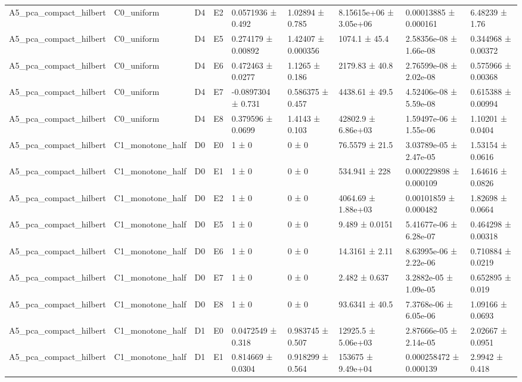 \begin{table}
\begin{tabular}{lllllllll}
A5\_pca\_compact\_hilbert & C0\_uniform & D4 & E2 & 0.0571936 ± 0.492 & 1.02894 ± 0.785 & 8.15615e+06 ± 3.05e+06 & 0.00013885 ± 0.000161 & 6.48239 ± 1.76 \\
A5\_pca\_compact\_hilbert & C0\_uniform & D4 & E5 & 0.274179 ± 0.00892 & 1.42407 ± 0.000356 & 1074.1 ± 45.4 & 2.58356e-08 ± 1.66e-08 & 0.344968 ± 0.00372 \\
A5\_pca\_compact\_hilbert & C0\_uniform & D4 & E6 & 0.472463 ± 0.0277 & 1.1265 ± 0.186 & 2179.83 ± 40.8 & 2.76599e-08 ± 2.02e-08 & 0.575966 ± 0.00368 \\
A5\_pca\_compact\_hilbert & C0\_uniform & D4 & E7 & -0.0897304 ± 0.731 & 0.586375 ± 0.457 & 4438.61 ± 49.5 & 4.52406e-08 ± 5.59e-08 & 0.615388 ± 0.00994 \\
A5\_pca\_compact\_hilbert & C0\_uniform & D4 & E8 & 0.379596 ± 0.0699 & 1.4143 ± 0.103 & 42802.9 ± 6.86e+03 & 1.59497e-06 ± 1.55e-06 & 1.10201 ± 0.0404 \\
A5\_pca\_compact\_hilbert & C1\_monotone\_half & D0 & E0 & 1 ± 0 & 0 ± 0 & 76.5579 ± 21.5 & 3.03789e-05 ± 2.47e-05 & 1.53154 ± 0.0616 \\
A5\_pca\_compact\_hilbert & C1\_monotone\_half & D0 & E1 & 1 ± 0 & 0 ± 0 & 534.941 ± 228 & 0.000229898 ± 0.000109 & 1.64616 ± 0.0826 \\
A5\_pca\_compact\_hilbert & C1\_monotone\_half & D0 & E2 & 1 ± 0 & 0 ± 0 & 4064.69 ± 1.88e+03 & 0.00101859 ± 0.000482 & 1.82698 ± 0.0664 \\
A5\_pca\_compact\_hilbert & C1\_monotone\_half & D0 & E5 & 1 ± 0 & 0 ± 0 & 9.489 ± 0.0151 & 5.41677e-06 ± 6.28e-07 & 0.464298 ± 0.00318 \\
A5\_pca\_compact\_hilbert & C1\_monotone\_half & D0 & E6 & 1 ± 0 & 0 ± 0 & 14.3161 ± 2.11 & 8.63995e-06 ± 2.22e-06 & 0.710884 ± 0.0219 \\
A5\_pca\_compact\_hilbert & C1\_monotone\_half & D0 & E7 & 1 ± 0 & 0 ± 0 & 2.482 ± 0.637 & 3.2882e-05 ± 1.09e-05 & 0.652895 ± 0.019 \\
A5\_pca\_compact\_hilbert & C1\_monotone\_half & D0 & E8 & 1 ± 0 & 0 ± 0 & 93.6341 ± 40.5 & 7.3768e-06 ± 6.05e-06 & 1.09166 ± 0.0693 \\
A5\_pca\_compact\_hilbert & C1\_monotone\_half & D1 & E0 & 0.0472549 ± 0.318 & 0.983745 ± 0.507 & 12925.5 ± 5.06e+03 & 2.87666e-05 ± 2.14e-05 & 2.02667 ± 0.0951 \\
A5\_pca\_compact\_hilbert & C1\_monotone\_half & D1 & E1 & 0.814669 ± 0.0304 & 0.918299 ± 0.564 & 153675 ± 9.49e+04 & 0.000258472 ± 0.000139 & 2.9942 ± 0.418 \\

\end{tabular}
\end{table}
